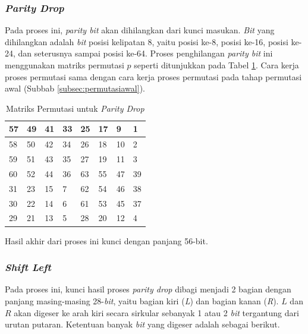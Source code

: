 \subsubsection{\textit{Parity Drop}}

Pada proses ini, \textit{parity bit} akan dihilangkan dari kunci masukan. \textit{Bit} yang dihilangkan adalah \textit{bit} posisi kelipatan 8, yaitu posisi ke-8, posisi ke-16, posisi ke-24, dan seterusnya sampai posisi ke-64. Proses penghilangan \textit{parity bit} ini menggunakan matriks permutasi \begin{math}p\end{math} seperti ditunjukkan pada Tabel \ref{table:parity_drop}. Cara kerja proses permutasi sama dengan cara kerja proses permutasi pada tahap permutasi awal (Subbab \ref{subsec:permutasiawal}).

\begin{table}[H]
	\begin{center}
		\caption{Matriks Permutasi untuk \textit{Parity Drop}}\label{table:parity_drop}
		\begin{tabular}{|l|l|l|l|l|l|l|l|}
				\hline
				57	&	49	&	41	&	33	&	25	&	17	&	9		&	1		\\ \hline
				58	&	50	&	42	&	34	&	26	&	18	&	10	&	2		\\ \hline
				59	&	51	&	43	&	35	&	27	&	19	&	11	&	3		\\ \hline
				60	&	52	&	44	&	36	&	63	&	55	&	47	&	39	\\ \hline
				31	&	23	&	15	&	7		&	62	&	54	&	46	&	38	\\ \hline
				30	&	22	&	14	&	6		&	61	&	53	&	45	&	37	\\ \hline
				29	&	21	&	13	&	5		&	28	&	20	&	12	&	4		\\ \hline
		\end{tabular}
	\end{center}
\end{table}

Hasil akhir dari proses ini kunci dengan panjang 56-bit.

\subsubsection{\textit{Shift Left}}

Pada proses ini, kunci hasil proses \textit{parity drop} dibagi menjadi 2 bagian dengan panjang masing-masing 28-\textit{bit}, yaitu bagian kiri (\textit{L}) dan bagian kanan (\textit{R}). \begin{math}L\end{math} dan \begin{math}R\end{math} akan digeser ke arah kiri secara sirkular sebanyak 1 atau 2 \textit{bit} tergantung dari urutan putaran. Ketentuan banyak \textit{bit} yang digeser adalah sebagai berikut.

